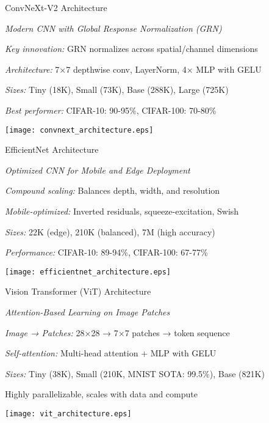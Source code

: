 \begin{slide}[\slideopts,toc={ConvNeXt}]{ConvNeXt-V2 Architecture}
  
  \emph{Modern CNN with Global Response Normalization (GRN)}
  
  \begin{itemize}
    \mpitem \emph{Key innovation:} GRN normalizes across spatial/channel dimensions
    
    \mpitem \emph{Architecture:} 7×7 depthwise conv, LayerNorm, 4× MLP with GELU
    
    \mpitem \emph{Sizes:} Tiny (18K), Small (73K), Base (288K), Large (725K)
    
    \mpitem \emph{Best performer:} CIFAR-10: 90-95\%, CIFAR-100: 70-80\%
  \end{itemize}
  
  \vspace{0.5em}
  \centerline{\texttt{[image: convnext\_architecture.eps]}}
\end{slide}

\begin{slide}[\slideopts,toc={EfficientNet}]{EfficientNet Architecture}
  
  \emph{Optimized CNN for Mobile and Edge Deployment}
  
  \begin{itemize}
    \mpitem \emph{Compound scaling:} Balances depth, width, and resolution
    
    \mpitem \emph{Mobile-optimized:} Inverted residuals, squeeze-excitation, Swish
    
    \mpitem \emph{Sizes:} 22K (edge), 210K (balanced), 7M (high accuracy)
    
    \mpitem \emph{Performance:} CIFAR-10: 89-94\%, CIFAR-100: 67-77\%
  \end{itemize}
  
  \vspace{0.5em}
  \centerline{\texttt{[image: efficientnet\_architecture.eps]}}
\end{slide}

\begin{slide}[\slideopts,toc={ViT}]{Vision Transformer (ViT) Architecture}
  
  \emph{Attention-Based Learning on Image Patches}
  
  \begin{itemize}
    \mpitem \emph{Image → Patches:} 28×28 → 7×7 patches → token sequence
    
    \mpitem \emph{Self-attention:} Multi-head attention + MLP with GELU
    
    \mpitem \emph{Sizes:} Tiny (38K), Small (210K, MNIST SOTA: 99.5\%), Base (821K)
    
    \mpitem Highly parallelizable, scales with data and compute
  \end{itemize}
  
  \vspace{0.5em}
  \centerline{\texttt{[image: vit\_architecture.eps]}}
\end{slide}

